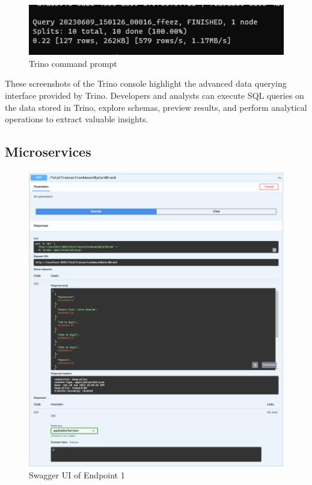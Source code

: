 \begin{figure}[H]
\centering
\includegraphics[width=\linewidth]{images/trino-3.png}
\caption{Trino command prompt}\label{fig:trino-3}
\end{figure}

These screenshots of the Trino console highlight the advanced data querying interface provided by Trino. Developers and analysts can execute SQL queries on the data stored in Trino, explore schemas, preview results, and perform analytical operations to extract valuable insights.

\subsection{Microservices}

\begin{figure}[H]
\centering
\includegraphics[width=\linewidth]{images/Swagger-UI-1.png}
\caption{Swagger UI of Endpoint 1}\label{fig:swagger-1}
\end{figure}

